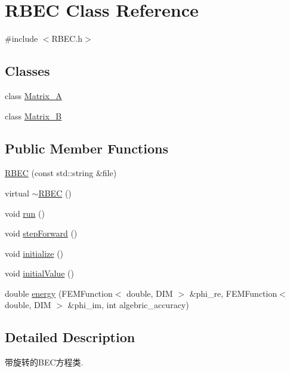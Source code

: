 \hypertarget{classRBEC}{\section{\-R\-B\-E\-C \-Class \-Reference}
\label{classRBEC}
}


{\ttfamily \#include $<$\-R\-B\-E\-C.\-h$>$}

\subsection*{\-Classes}
\begin{DoxyCompactItemize}
\item 
class \hyperlink{classRBEC_1_1Matrix__A}{\-Matrix\-\_\-\-A}
\item 
class \hyperlink{classRBEC_1_1Matrix__B}{\-Matrix\-\_\-\-B}
\end{DoxyCompactItemize}
\subsection*{\-Public \-Member \-Functions}
\begin{DoxyCompactItemize}
\item 
\hyperlink{classRBEC_a723be498ca090edc6e274a7bd1f67e3a}{\-R\-B\-E\-C} (const std\-::string \&file)
\item 
virtual \hyperlink{classRBEC_aad73215677771c5db888aeba1e4ea9b6}{$\sim$\-R\-B\-E\-C} ()
\item 
void \hyperlink{classRBEC_aea72cfa81063a39d0e0893b47746d9ec}{run} ()
\item 
void \hyperlink{classRBEC_a4e86bc643b4e635c6ac2a8e5c33194a7}{step\-Forward} ()
\item 
void \hyperlink{classRBEC_a6b49753b683daeb077c8e6ad7869334c}{initialize} ()
\item 
void \hyperlink{classRBEC_af0c239804c4823203b24caa207fe57c9}{initial\-Value} ()
\item 
double \hyperlink{classRBEC_a045feaa0f3e1a7bee513e999dfad18df}{energy} (\-F\-E\-M\-Function$<$ double, \-D\-I\-M $>$ \&phi\-\_\-re, \-F\-E\-M\-Function$<$ double, \-D\-I\-M $>$ \&phi\-\_\-im, int algebric\-\_\-accuracy)
\end{DoxyCompactItemize}


\subsection{\-Detailed \-Description}
带旋转的\-B\-E\-C方程类. 

